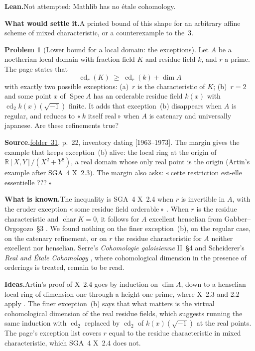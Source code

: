 \documentclass[11pt]{article}
\newcommand{\q}[1]{«\,#1\,»}
\newcommand{\fac}[1]{\href{https://grothendieck.umontpellier.fr/#1.pdf}{folder~#1}}
\newcommand{\cd}{\operatorname{cd}}
\newcommand{\Spec}{\operatorname{Spec}}
\theoremstyle{definition}
\newtheorem{problem}{Problem}
\theoremstyle{plain}\newtheorem*{proposition}{Proposition}\theoremstyle{definition}
\newcommand{\entry}[1]{\par\medskip\noindent\textbf{#1}\enspace}
\newcommand{\src}[1]{\entry{Source.}#1}
\newcommand{\known}{\entry{What is known.}}
\newcommand{\ideas}{\entry{Ideas.}}
\newcommand{\leanst}{\entry{Lean.}}
\newcommand{\settle}{\entry{What would settle it.}}
\begin{document}
\leanst Not attempted: Mathlib has no étale cohomology.

\settle A printed bound of this shape for an arbitrary affine scheme of mixed characteristic, or a counterexample to the~$3$.

\begin{problem}[Lower bound for a local domain: the exceptions]\label{p:lower}
Let $A$ be a noetherian local domain with fraction field $K$ and residue field $k$, and $r$ a prime. The page states that
\[
\cd_r(K) \;\ge\; \cd_r(k) + \dim A
\]
with exactly two possible exceptions: (a)~$r$ is the characteristic of $K$; (b)~$r = 2$ and some point $x$ of $\Spec A$ has an orderable residue field $k(x)$ with $\cd_2 k(x)(\sqrt{-1})$ finite. It adds that exception~(b) disappears when $A$ is regular, and reduces to \q{$k$ itself real} when $A$ is catenary and universally japanese. Are these refinements true?
\end{problem}

\src{\fac{31}, p.~22, inventory dating [1963--1973]. The margin gives the example that keeps exception~(b) alive: the local ring at the origin of $\mathbb R[X,Y]/(X^2+Y^2)$, a real domain whose only real point is the origin (Artin's example after SGA~4 X~2.3). The margin also asks: \q{cette restriction est-elle essentielle ???}}

\known The inequality is SGA~4 X~2.4 when $r$ is invertible in $A$, with the cruder exception \q{some residue field orderable} \cite{sga4}. When $r$ is the residue characteristic and $\operatorname{char} K = 0$, it follows for $A$ excellent henselian from Gabber--Orgogozo~\S3 \cite{gabberorgogozo}. We found nothing on the finer exception~(b), on the regular case, on the catenary refinement, or on $r$ the residue characteristic for $A$ neither excellent nor henselian. Serre's \emph{Cohomologie galoisienne} II~\S4 and Scheiderer's \emph{Real and Étale Cohomology} \cite{scheiderer}, where cohomological dimension in the presence of orderings is treated, remain to be read.

\ideas Artin's proof of X~2.4 goes by induction on $\dim A$, down to a henselian local ring of dimension one through a height-one prime, where X~2.3 and 2.2 apply \cite{sga4}. The finer exception~(b) says that what matters is the virtual cohomological dimension of the real residue fields, which suggests running the same induction with $\cd_2$ replaced by $\cd_2$ of $k(x)(\sqrt{-1})$ at the real points. The page's exception list covers $r$ equal to the residue characteristic in mixed characteristic, which SGA~4 X~2.4 does not.
\end{document}
